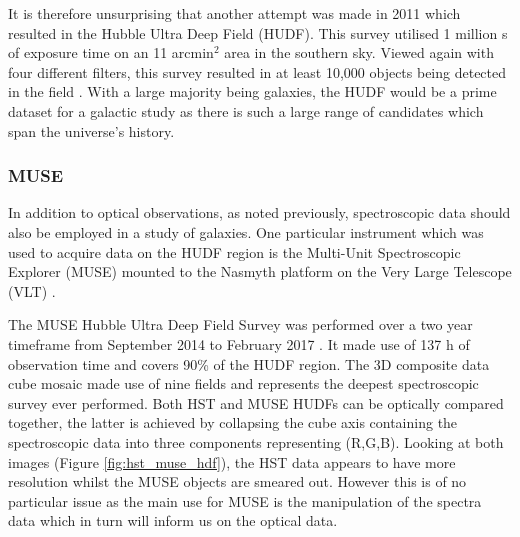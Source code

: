 \documentclass[12pt, twocolumn]{revtex4-1}    %
\begin{document}
It is therefore unsurprising that another attempt was made in 2011 which resulted in the Hubble Ultra Deep Field (HUDF). This survey utilised 1 million s of exposure time on an 11 arcmin$^2$ area in the southern sky. Viewed again with four different filters, this survey resulted in at least 10,000 objects being detected in the field \citep{beckwith_hudf}. With a large majority being galaxies, the HUDF would be a prime dataset for a galactic study as there is such a large range of candidates which span the universe's history. 



\subsubsection{MUSE}

In addition to optical observations, as noted previously, spectroscopic data should also be employed in a study of galaxies. One particular instrument which was used to acquire data on the HUDF region is the Multi-Unit Spectroscopic Explorer (MUSE) mounted to the Nasmyth platform on the Very Large Telescope (VLT) \citep{bacon_muse_proposal}. 


The MUSE Hubble Ultra Deep Field Survey was performed over a two year timeframe from September 2014 to February 2017 \citep{bacon_muse_hudf}. It made use of 137 h of observation time and covers 90\% of the HUDF region. The 3D composite data cube mosaic made use of nine fields and represents the deepest spectroscopic survey ever performed. Both HST and MUSE HUDFs can be optically compared together, the latter is achieved by collapsing the cube axis containing the spectroscopic data into three components representing (R,G,B). Looking at both images (Figure \ref{fig:hst_muse_hdf}), the HST data appears to have more resolution whilst the MUSE objects are smeared out. However this is of no particular issue as the main use for MUSE is the manipulation of the spectra data which in turn will inform us on the optical data.


\end{document}
